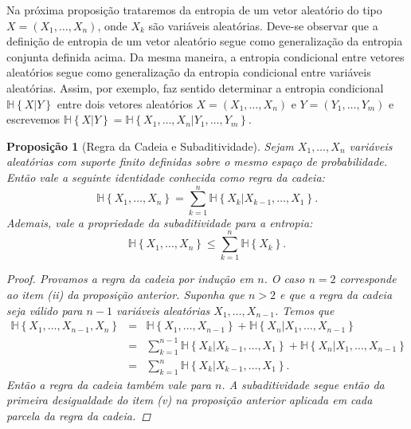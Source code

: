 \documentclass{amsart}
\theoremstyle{theorem}
\newtheorem{proposicao}{Proposi\c{c}\~{a}o}[section]
\theoremstyle{definition}
\theoremstyle{remark}
\numberwithin{equation}{section}
\newcommand{\HH}[1]{\mathbb{H}\left\{ #1 \right\}}
\begin{document}
Na pr\'{o}xima proposi\c{c}\~{a}o trataremos da entropia de um vetor aleat\'{o}rio do tipo $X = (X_1,\ldots,X_n)$, onde $X_k$ s\~{a}o vari\'{a}veis aleat\'{o}rias. Deve-se observar que a defini\c{c}\~{a}o de entropia de um vetor aleat\'{o}rio segue como generaliza\c{c}\~{a}o da entropia conjunta definida acima. Da mesma maneira, a entropia condicional entre vetores aleat\'{o}rios segue como generaliza\c{c}\~{a}o da entropia condicional entre vari\'{a}veis aleat\'{o}rias. Assim, por exemplo, faz sentido determinar a entropia condicional $\HH{X|Y}$ entre dois vetores aleat\'{o}rios $X = (X_1,\ldots,X_n)$ e $Y = (Y_1,\ldots,Y_m)$ e escrevemos $\HH{X|Y} = \HH{X_1,\ldots,X_n|Y_1,\ldots,Y_m}$.

\begin{proposicao}[Regra da Cadeia e Subaditividade]
  Sejam $X_1,\ldots,X_n$ vari\'{a}veis aleat\'{o}rias com suporte finito definidas sobre o mesmo espa\c{c}o de probabilidade. Ent\~{a}o vale a seguinte identidade conhecida como regra da cadeia:
  \begin{equation}
    \HH{X_1,\ldots,X_n} = \sum_{k=1}^{n} \HH{X_k|X_{k-1},\ldots,X_1}.
  \end{equation}
  Ademais, vale a propriedade da subaditividade para a entropia:
  \begin{equation}
    \HH{X_1,\ldots,X_n} \leq \sum_{k=1}^{n} \HH{X_k}.
  \end{equation}
  \begin{proof}
    Provamos a regra da cadeia por indu\c{c}\~{a}o em $n$. O caso $n=2$ corresponde ao item (ii) da proposi\c{c}\~{a}o anterior. Suponha que $n>2$ e que a regra da cadeia seja v\'{a}lido para $n-1$ vari\'{a}veis aleat\'{o}rias $X_1,\ldots,X_{n-1}$. Temos que
    \begin{equation*}
    \begin{array}{rcl}
      \HH{X_1,\ldots,X_{n-1},X_n} &=& \HH{X_1,\ldots,X_{n-1}} + \HH{X_n|X_1,\ldots,X_{n-1}}\\
       &=& \displaystyle \sum_{k=1}^{n-1} \HH{X_k|X_{k-1},\ldots,X_1} + \HH{X_n|X_1,\ldots,X_{n-1}}\\
       &=& \displaystyle \sum_{k=1}^{n} \HH{X_k|X_{k-1},\ldots,X_1}.
    \end{array}
    \end{equation*}
    Ent\~{a}o a regra da cadeia tamb\'{e}m vale para $n$. A subaditividade segue ent\~{a}o da primeira desigualdade do item (v) na proposi\c{c}\~{a}o anterior aplicada em cada parcela da regra da cadeia.
  \end{proof}
\end{proposicao}
\end{document}
